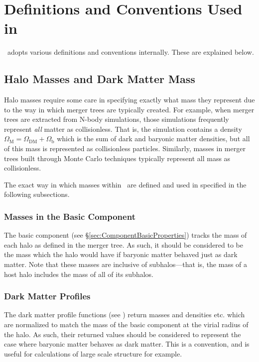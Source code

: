 \chapter{Definitions and Conventions Used in \glc}

\glc\ adopts various definitions and conventions internally. These are explained below.

\section{Halo Masses and Dark Matter Mass}

Halo masses require some care in specifying exactly what mass they represent due to the way in which merger trees are typically created. For example, when merger trees are extracted from N-body simulations, those simulations frequently represent \emph{all} matter as collisionless. That is, the simulation contains a density $\Omega_\mathrm{M}=\Omega_\mathrm{DM}+\Omega_\mathrm{b}$ which is the sum of dark and baryonic matter densities, but all of this mass is represented as collisionless particles. Similarly, masses in merger trees built through Monte Carlo techniques typically represent all mass as collisionless.

The exact way in which masses within \glc\ are defined and used in specified in the following subsections.

\subsection{Masses in the Basic Component}

The {\normalfont \ttfamily basic} component (see \S\ref{sec:ComponentBasicProperties}) tracks the mass of each halo as defined in the merger tree. As such, it should be considered to be the mass which the halo would have if baryonic matter behaved just as dark matter. Note that these masses are inclusive of subhalos---that is, the mass of a host halo includes the mass of all of its subhalos.

\subsection{Dark Matter Profiles}

The dark matter profile functions (see ) return masses and densities etc. which are normalized to match the mass of the {\normalfont \ttfamily basic} component at the virial radius of the halo. As such, their returned values should be considered to represent the case where baryonic matter behaves as dark matter. This is a convention, and is useful for calculations of large scale structure for example.


